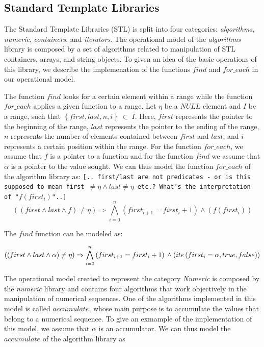 \documentclass[a4paper]{llncs}
\newcommand{\blurb}[1]{{\texttt{[.. #1..]}}}
\begin{document}
\subsection{Standard Template Libraries}

The Standard Template Libraries (STL) is split into
four categories: \textit{algorithms}, \textit{numeric},
\textit{containers}, and \textit{iterators}. The operational model
of the \textit{algorithms} library is composed by a set of algorithms
related to manipulation of STL containers, arrays, and string objects.
To given an idea of the basic operations of this library, we describe
the implemenation of the functions $find$ and $for\_each$ in our
operational model.

The function $find$ looks for a certain element within a range while the
function $for\_each$ applies a given function to a range. Let $\eta$ be
a $NULL$ element and $I$ be a range, such that $\left\{first, last, n, i\right\}\:\subset\:I$.
Here, $first$ represents the pointer to the beginning of the range, $last$ represents
the pointer to the ending of the range, $n$ represents the number of elements
contained between $first$ and $last$, and $i$ represents a certain position
within the range. For the function $for\_each$, we assume that $f$ is a pointer
to a function and for the function $find$ we assume that $\alpha$ is a pointer to the value sought.
We can thus model the function $for\_each$ of the algorithm library as:
\blurb{first/last are not  predicates - or is this supposed to mean first 
$\neq \eta \wedge last\neq\eta$ etc.? What's the interpretation of "$f(first_i)$"}
%
\begin{equation}
\left(\left(first \wedge last \wedge f\right) \neq \eta\right) \Rightarrow
\bigwedge^{n}_{i=0} \left(first_{i+1} = first_{i} +1\right) \wedge \left(f\left(first_{i}\right)\right)
\label{eq:model-for-each}
\end{equation}

The $find$ function can be modeled as:

\begin{equation}\left(\left(first \wedge last \wedge \alpha\right) \neq \eta\right) \Rightarrow
\bigwedge^{n}_{i=0} \left(first_{i+1} = first_{i} +1\right)\\ \wedge \left(ite\left(first_{i} = \alpha, true,  false\right)\right)
\label{eq:model-find}
\end{equation}

The operational model created to represent the category \textit{Numeric} is
composed by the \textit{numeric} library and contains four algorithms that work
objectively in the manipulation of numerical sequences. One of the algorithms
implemented in this model is called $accumulate$, whose main purpose is
to accumulate the values that belong to a numerical sequence. To give an exmample
of the implementation of this model, we assume that $\alpha$ is an accumulator.
We can thus model the $accumulate$ of the algorithm library as
\end{document}
